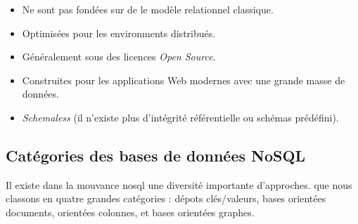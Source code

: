 \begin{itemize}
\item Ne sont pas fondées sur de le modèle relationnel classique.
\item Optimisées pour les environments distribués.
\item Généralement sous des licences \emph{Open Source}.
\item Construites pour les applications Web modernes avec une grande
  masse de données.
\item \emph{Schemaless} (il n'existe plus d'intégrité référentielle ou
  schémas prédéfini).
\end{itemize}

  \subsection{Catégories des bases de données NoSQL}
  \label{sec:cat-nosql}
  Il existe dans la mouvance \acrshort{nosql} une diversité importante
  d'approches. que nous classons en quatre grandes catégories : dépots
  clés/valeurs, bases orientées documents, orientées colonnes, et
  bases orientées graphes.

